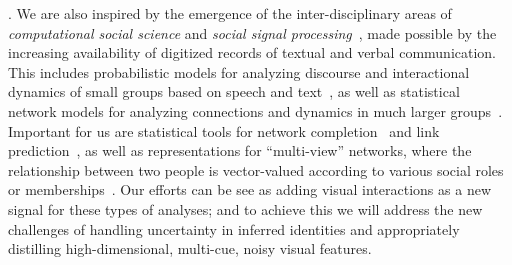 
. We are also inspired by the emergence of the inter-disciplinary areas of \emph{computational social science} \cite{Lazer2009} and \emph{social signal processing}~\cite{Pantic}, made possible by the increasing availability of digitized records of textual and verbal communication. This includes probabilistic models for analyzing discourse and interactional dynamics of small groups based on speech and text~\cite{Basu:meeting,Dong,Choudhury:MHMM,Pan:influence}, as well as statistical network models for analyzing connections and dynamics in much larger groups~\cite{Goldenberg,Kolacyzk,Snijders,Rossi}. Important for us are statistical tools for network completion~\cite{Clauset,Guimera,HannekeX09,KimL11} and link prediction~\cite{Goldberg,Liben-Nowell,TaskarWAK03}, as well as representations for ``multi-view'' networks, where the relationship between two people is vector-valued according to various social roles or memberships~\cite{AiroldiBFX08,Kim12}. 
Our efforts can be see as adding visual interactions as a new signal for these types of analyses; and to achieve this we will address the new challenges of handling uncertainty in inferred identities and appropriately distilling high-dimensional, multi-cue, noisy visual features.






